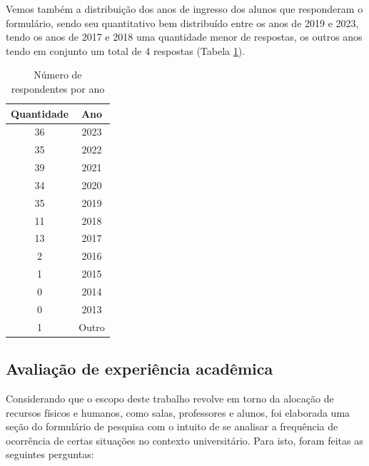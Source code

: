 Vemos também a distribuição dos anos de ingresso dos alunos que responderam o formulário, sendo seu quantitativo bem distribuído entre os anos de 2019 e 2023, tendo os anos de 2017 e 2018 uma quantidade menor de respostas, os outros anos tendo em conjunto um total de 4 respostas (Tabela \ref{table:2.2_SobreVoce_Anos}).

\begin{table}[htbp]
  \centering
  \caption{\label{table:2.2_SobreVoce_Anos}Número de respondentes por ano}
  \begin{tabular}{| c c |}
    \hline
    \textbf{Quantidade} & \textbf{Ano} \\
    \hline
    36                  & 2023         \\
    35                  & 2022         \\
    39                  & 2021         \\
    34                  & 2020         \\
    35                  & 2019         \\
    11                  & 2018         \\
    13                  & 2017         \\
    2                   & 2016         \\
    1                   & 2015         \\
    0                   & 2014         \\
    0                   & 2013         \\
    1                   & Outro        \\
    \hline
  \end{tabular}
\end{table}

\subsection{Avaliação de experiência acadêmica} %

Considerando que o escopo deste trabalho revolve em torno da alocação de recursos físicos e humanos, como salas, professores e alunos, foi elaborada uma seção do formulário de pesquisa com o intuito de se analisar a frequência de ocorrência de certas situações no contexto universitário. Para isto, foram feitas as seguintes perguntas:

